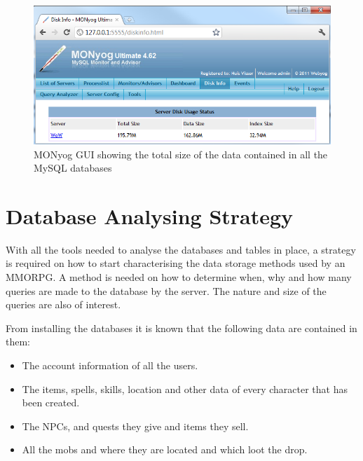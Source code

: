\begin{figure}[htbp]
\centering
\includegraphics[scale = 0.65]{monyog.png}	
\caption{MONyog GUI showing the total size of the data contained in all the MySQL databases}
\label{monyog}
\end{figure}




\section{Database Analysing Strategy}
\label{datastrategy}

With all the tools needed to analyse the databases and tables in place, a strategy is required on how to start characterising the data storage methods used by an MMORPG. A method is needed on how to determine when, why and how many queries are made to the database by the server. The nature and size of the queries are also of interest. 

From installing the databases it is known that the following data are contained in them:

\begin{itemize}
	\item The account information of all the users.
	\item The items, spells, skills, location and other data of every character that has been created.
	\item The NPCs, and quests they give and items they sell.
	\item All the mobs and where they are located and which loot the drop.
\end{itemize}


